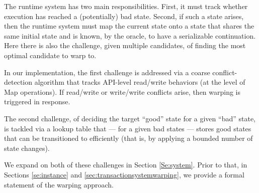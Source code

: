 The runtime system has two main responsibilities. First, it must track whether execution has reached a (potentially) bad state. Second, if such a state arises, then the runtime system must map the current state onto a state that shares the same initial state and is known, by the oracle, to have a serializable continuation. Here there is also the challenge, given multiple candidates, of finding the most optimal candidate to warp to.

In our implementation, the first challenge is addressed via a coarse conflict-detection algorithm that tracks API-level read/write behaviors (at the level of {\sf Map} operations). If read/write or write/write conflicts arise, then warping is triggered in response. 

The second challenge, of deciding the target ``good'' state for a given ``bad'' state, is tackled via a lookup table that --- for a given bad states --- stores good states that can be transitioned to efficiently (that is, by applying a bounded number of state changes).

We expand on both of these challenges in Section \ref{Se:system}. Prior to that, in Sections \ref{se:instance} and \ref{sec:transactionsystemwarping}, we provide a formal statement of the warping approach.